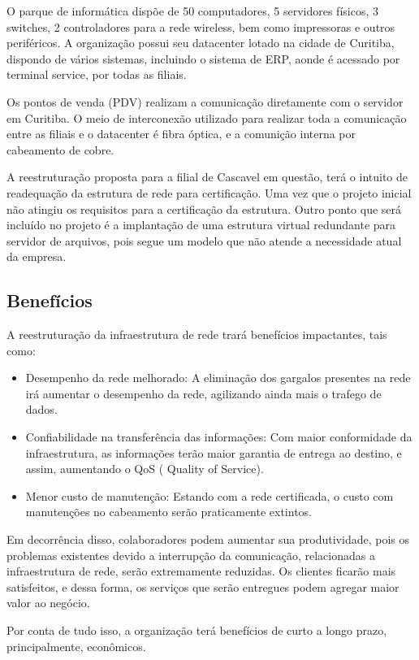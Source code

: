 \documentclass[	DIV=calc,%
							paper=a4,%
							fontsize=12pt,%
							onecolumn]{scrartcl}	 					%
\begin{document}
O parque de informática dispõe de 50 computadores, 5 servidores físicos, 3 switches, 2 controladores para a rede wireless, bem como impressoras e outros periféricos. A organização possui seu datacenter lotado na cidade de Curitiba, dispondo de vários sistemas, incluindo o sistema de ERP, aonde é acessado por terminal service, por todas as filiais.

Os pontos de venda (PDV) realizam a comunicação diretamente com o servidor em Curitiba. O meio de interconexão utilizado para realizar toda a comunicação entre as filiais e o datacenter é fibra óptica, e a comunição interna por cabeamento de cobre.

A reestruturação proposta para a filial de Cascavel em questão, terá o intuito de readequação da estrutura de rede para certificação. Uma vez que o projeto inicial não atingiu os requisitos para a certificação da estrutura. Outro ponto que será incluído no projeto é a implantação de uma estrutura virtual redundante para servidor de arquivos, pois segue um modelo que não atende a necessidade atual da empresa. 
\subsection{Benefícios}
A reestruturação da infraestrutura de rede trará benefícios impactantes, tais como:
\begin{itemize}
	\item Desempenho da rede melhorado: A eliminação dos gargalos presentes na rede irá aumentar o desempenho da rede, agilizando ainda mais o trafego de dados.
	
	\item Confiabilidade na transferência das informações: Com maior conformidade da infraestrutura, as informações terão maior garantia de entrega ao destino, e assim, aumentando o QoS ( Quality of Service).
	
	\item Menor custo de manutenção: Estando com a rede certificada, o custo com manutenções no cabeamento serão praticamente extintos.
\end{itemize}
Em decorrência disso, colaboradores podem aumentar sua produtividade, pois os problemas existentes devido a interrupção da comunicação, relacionadas a infraestrutura de rede, serão extremamente reduzidas. Os clientes ficarão mais satisfeitos, e dessa forma, os serviços que serão entregues podem agregar maior valor ao negócio. 

Por conta de tudo isso, a organização terá benefícios de curto a longo prazo, principalmente, econômicos.
\end{document}
